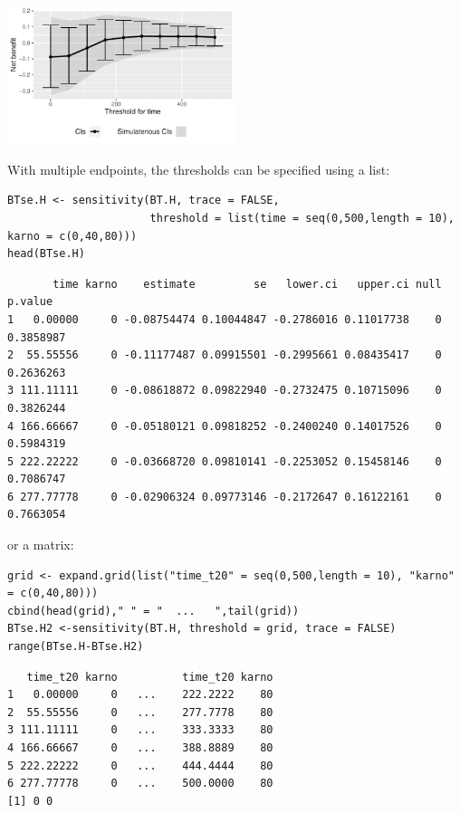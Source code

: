 \documentclass[12pt]{article}
\begin{document}
\begin{center}
\includegraphics[width=0.5\textwidth]{./figures/gg-sensitivity1.pdf}
\end{center}

With multiple endpoints, the thresholds can be specified using a list:
\lstset{language=r,label= ,caption= ,captionpos=b,numbers=none}
\begin{lstlisting}
BTse.H <- sensitivity(BT.H, trace = FALSE,
                      threshold = list(time = seq(0,500,length = 10), karno = c(0,40,80)))
head(BTse.H)
\end{lstlisting}

\begin{verbatim}
       time karno    estimate         se   lower.ci   upper.ci null   p.value
1   0.00000     0 -0.08754474 0.10044847 -0.2786016 0.11017738    0 0.3858987
2  55.55556     0 -0.11177487 0.09915501 -0.2995661 0.08435417    0 0.2636263
3 111.11111     0 -0.08618872 0.09822940 -0.2732475 0.10715096    0 0.3826244
4 166.66667     0 -0.05180121 0.09818252 -0.2400240 0.14017526    0 0.5984319
5 222.22222     0 -0.03668720 0.09810141 -0.2253052 0.15458146    0 0.7086747
6 277.77778     0 -0.02906324 0.09773146 -0.2172647 0.16122161    0 0.7663054
\end{verbatim}


or a matrix:

\lstset{language=r,label= ,caption= ,captionpos=b,numbers=none}
\begin{lstlisting}
grid <- expand.grid(list("time_t20" = seq(0,500,length = 10), "karno" = c(0,40,80)))
cbind(head(grid)," " = "  ...   ",tail(grid))
BTse.H2 <-sensitivity(BT.H, threshold = grid, trace = FALSE)
range(BTse.H-BTse.H2)
\end{lstlisting}

\begin{verbatim}
   time_t20 karno          time_t20 karno
1   0.00000     0   ...    222.2222    80
2  55.55556     0   ...    277.7778    80
3 111.11111     0   ...    333.3333    80
4 166.66667     0   ...    388.8889    80
5 222.22222     0   ...    444.4444    80
6 277.77778     0   ...    500.0000    80
[1] 0 0
\end{verbatim}
\end{document}

